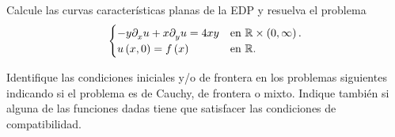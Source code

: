 \question

Calcule las curvas características planas de la EDP y resuelva
el problema
\begin{equation*}
	\begin{cases}
		-y\difcp{u}{x}+
		x\difcp{u}{y}=4xy &
		\text{en }\mathbb{R}\times\left(0,\infty\right). \\
		u\left(x,0\right)=
		f\left(x\right)   &
		\text{en }\mathbb{R}.
	\end{cases}
\end{equation*}

\question

Identifique las condiciones iniciales y/o de frontera en los
problemas siguientes
indicando si el problema es de Cauchy, de frontera o mixto.
Indique también si alguna de las funciones dadas tiene que satisfacer
las condiciones de compatibilidad.

